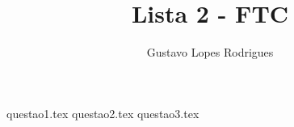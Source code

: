 \documentclass[10pt,a4paper]{article}
\author{Gustavo Lopes Rodrigues}
\title{Lista 2 - FTC}
\begin{document}
	\maketitle
	
	{questao1.tex}
	{questao2.tex}
	{questao3.tex}
\end{document}
